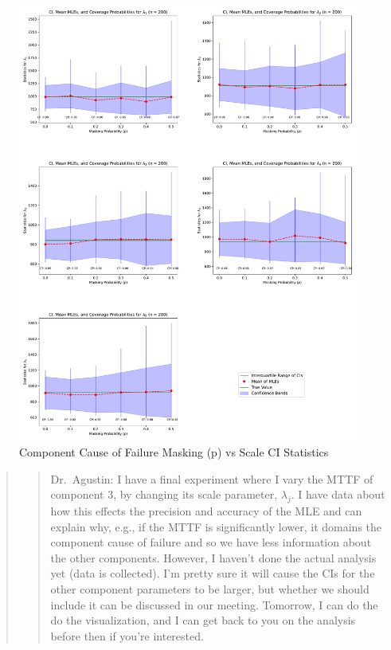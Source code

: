 \documentclass[
]{article}
\begin{document}
\begin{figure}

{\centering \includegraphics{image/plot-p-vs-stats-scale} 

}

\caption{Component Cause of Failure Masking (p) vs Scale CI Statistics}\label{fig:masking-prob-vs-stats-scale}
\end{figure}

\begin{quote}
\begin{quote}
Dr.~Agustin: I have a final experiment where I vary the MTTF of
component 3, by changing its scale parameter, \(\lambda_j\). I have data
about how this effects the precision and accuracy of the MLE and can
explain why, e.g., if the MTTF is significantly lower, it domains the
component cause of failure and so we have less information about the
other components. However, I haven't done the actual analysis yet (data
is collected). I'm pretty sure it will cause the CIs for the other
component parameters to be larger, but whether we should include it can
be discussed in our meeting. Tomorrow, I can do the do the
visualization, and I can get back to you on the analysis before then if
you're interested.
\end{quote}
\end{quote}
\end{document}
